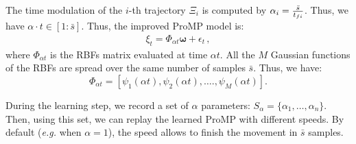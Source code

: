 \documentclass[utf8]{frontiersSCNS} %
\newcommand{\todo}[1]{\textcolor{red}{\textbf{/*#1*/}}}
\begin{document}
The time modulation of the $i$-th trajectory $\Xi_i$ is computed by $ \alpha_i = {\bar{s} \over t_{fi}}$. Thus, we have $\alpha \cdot t \in [1:\bar{s}]$. Thus, the improved ProMP model is:
\begin{eqnarray}
\xi_t = \Phi_{\alpha t} \boldsymbol{\omega} + \epsilon_t \, ,
\end{eqnarray}
where $\Phi_{\alpha t}$ is the RBFs matrix evaluated at time $\alpha t$. All the $M$ Gaussian functions of the RBFs are spread over the same number of samples $\bar{s}$. Thus, we have:
$$ \Phi_{\alpha t}=[\psi_{1}(\alpha t), \psi_{2}(\alpha t), \ldots., \psi_{M}(\alpha t)].$$

%
%
%
%

During the learning step, we record a set of $\alpha$ parameters: $S_{\alpha} = \{\alpha_{1},\ldots,\alpha_{n}\}$.
Then, using this set, we can replay the learned ProMP with different speeds. By default (\textit{e.g.} when $\alpha=1$), the speed allows to finish the movement in $\bar{s}$ samples.
\end{document}
